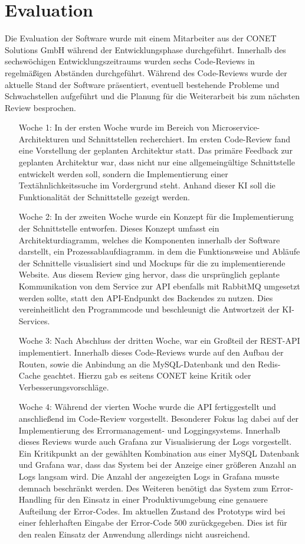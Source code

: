 \section{Evaluation}
Die Evaluation der Software wurde mit einem Mitarbeiter aus der CONET Solutions GmbH während der Entwicklungsphase durchgeführt. Innerhalb des sechswöchigen Entwicklungszeitraums wurden sechs Code-Reviews in regelmäßigen Abständen durchgeführt. Während des Code-Reviews wurde der aktuelle Stand der Software präsentiert, eventuell bestehende Probleme und Schwachstellen aufgeführt und die Planung für die Weiterarbeit bis zum nächsten Review besprochen.

\begin{itemize}[leftmargin=6em]
\item [Woche 1:] In der ersten Woche wurde im Bereich von Microservice-Architekturen und Schnittstellen recherchiert. Im ersten Code-Review fand eine Vorstellung der geplanten Architektur statt. Das primäre Feedback zur geplanten Architektur war, dass nicht nur eine allgemeingültige Schnittstelle entwickelt werden soll, sondern die Implementierung einer Textähnlichkeitssuche im Vordergrund steht. Anhand dieser KI soll die Funktionalität der Schnittstelle gezeigt werden.
\item [Woche 2:] In der zweiten Woche wurde ein Konzept für die Implementierung der Schnittstelle entworfen. Dieses Konzept umfasst ein Architekturdiagramm, welches die Komponenten innerhalb der Software darstellt, ein Prozessablaufdiagramm. in dem die Funktionsweise und Abläufe der Schnittelle visualisiert sind und Mockups für die zu implementierende Website. Aus diesem Review ging hervor, dass die ursprünglich geplante Kommunikation von dem Service zur API ebenfalls mit RabbitMQ umgesetzt werden sollte, statt den API-Endpunkt des Backendes zu nutzen. Dies vereinheitlicht den Programmcode und beschleunigt die Antwortzeit der KI-Services.
\item [Woche 3:] Nach Abschluss der dritten Woche, war ein Großteil der REST-API implementiert. Innerhalb dieses Code-Reviews wurde auf den Aufbau der Routen, sowie die Anbindung an die MySQL-Datenbank und den Redis-Cache geachtet. Hierzu gab es seitens CONET keine Kritik oder Verbesserungsvorschläge.
\item [Woche 4:] Während der vierten Woche wurde die API fertiggestellt und anschließend im Code-Review vorgestellt. Besonderer Fokus lag dabei auf der Implementierung des Errormanagement- und Loggingsystems. Innerhalb dieses Reviews wurde auch Grafana zur Visualisierung der Logs vorgestellt. Ein Kritikpunkt an der gewählten Kombination aus einer MySQL Datenbank und Grafana war, dass das System bei der Anzeige einer größeren Anzahl an Logs langsam wird. Die Anzahl der angezeigten Logs in Grafana musste demnach beschränkt werden. Des Weiteren benötigt das System zum Error-Handling für den Einsatz in einer Produktivumgebung eine genauere Aufteilung der Error-Codes. Im aktuellen Zustand des Prototyps wird bei einer fehlerhaften Eingabe der Error-Code 500 zurückgegeben. Dies ist für den realen Einsatz der Anwendung allerdings nicht ausreichend.

\end{itemize}
